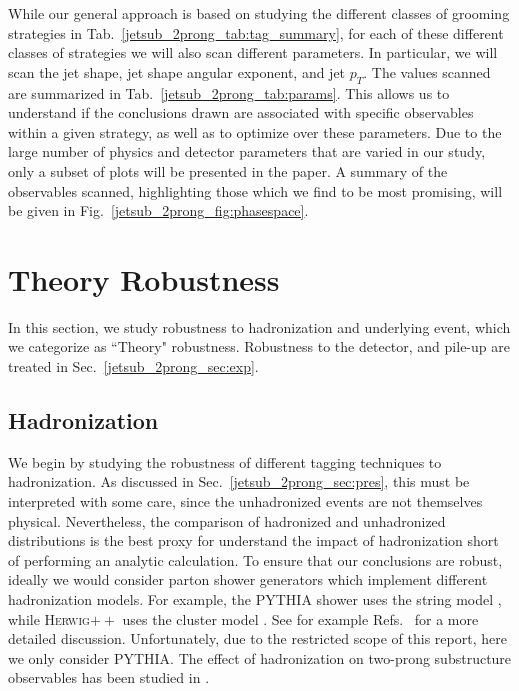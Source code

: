 \documentclass[11pt]{cernrep}
\begin{document}
While our general approach is based on studying the different classes of grooming strategies in Tab.~\ref{jetsub_2prong_tab:tag_summary}, for each of these different classes of strategies we will also scan different parameters.
%
In particular, we will scan the jet shape, jet shape angular exponent, and jet $p_T$.
%
The values scanned are summarized in Tab.~\ref{jetsub_2prong_tab:params}.
%
This allows us to understand if the conclusions drawn are associated with specific observables within a given strategy, as well as to optimize over these parameters.
%
Due to the large number of physics and detector parameters that are varied in our study, only a subset of plots will be presented in the paper. A summary of the observables scanned, highlighting those which we find to be most promising, will be given in Fig.~\ref{jetsub_2prong_fig:phasespace}.
%






\section{Theory Robustness}\label{jetsub_2prong_sec:np}


In this section, we study robustness to hadronization and underlying event, which we categorize as ``Theory" robustness. Robustness to the detector, and pile-up are treated in Sec.~\ref{jetsub_2prong_sec:exp}. 




\subsection{Hadronization}\label{jetsub_2prong_sec:hadr}








We begin by studying the robustness of different tagging techniques to hadronization.
%
As discussed in Sec.~\ref{jetsub_2prong_sec:pres}, this must be interpreted with some care, since the unhadronized events are not themselves physical.
%
Nevertheless, the comparison of hadronized and unhadronized distributions is the best proxy for understand the impact of hadronization short of performing an analytic calculation.
%
To ensure that our conclusions are robust, ideally we would consider parton shower generators which implement different hadronization models.
%
For example, the \textsc{PYTHIA} shower uses the string model \cite{Andersson:1983ia,Andersson:1998tv}, while \textsc{Herwig}$++$ uses the cluster model \cite{Webber:1983if,Marchesini:1987cf}.
%
See for example Refs.~\cite{Buckley:2011ms,Skands:2011pf,Skands:2012ts} for a more detailed discussion.
%
Unfortunately, due to the restricted scope of this report, here we only consider \textsc{PYTHIA}.
%
The effect of hadronization on two-prong substructure observables has been studied in \cite{Larkoski:2015kga,Salam:2016yht,Larkoski:2017iuy,Larkoski:2017cqq}.
\end{document}
